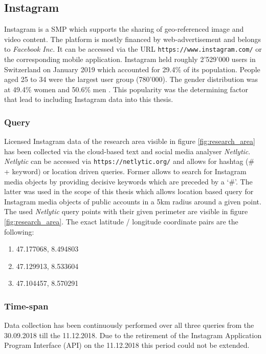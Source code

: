 \subsection{Instagram} \label{instagram}
Instagram is a SMP which supports the sharing of geo-referenced image and video content. The platform is mostly financed by web-advertisement and belongs to \textit{Facebook Inc.} It can be accessed via the URL \texttt{https://www.instagram.com/} or the corresponding mobile application.
Instagram held roughly 2\rq529\rq000 users in Switzerland on January 2019 which accounted for 29.4\% of its population. People aged 25 to 34 were the largest user group (780\rq 000). The gender distribution was at 49.4\% women and 50.6\% men \cite{NapoleonCat2019NoTitle}. This popularity was the determining factor that lead to including Instagram data into this thesis.\\

\subsubsection{Query} \label{netlytic}
Licensed Instagram data of the research area visible in figure \ref{fig:research_area} has been collected via the cloud-based text and social media analyser \textit{Netlytic}. \textit{Netlytic} can be accessed via \texttt{https://netlytic.org/} and allows for hashtag (\# + keyword) or location driven queries. Former allows to search for Instagram media objects by providing decisive keywords which are preceded by a \lq \#\rq. The latter was used in the scope of this thesis which allows location based query for Instagram media objects of public accounts in a 5km radius around a given point. The used \textit{Netlytic} query points with their given perimeter are visible in figure \ref{fig:research_area}. The exact latitude / longitude coordinate pairs are the following:\\
\begin{enumerate}
  \item 47.177068, 8.494803
  \item 47.129913, 8.533604
  \item 47.104457, 8.570291
\end{enumerate}

\subsubsection{Time-span} \label{instagram_timespan}
Data collection has been continuously performed over all three queries from the 30.09.2018 till the 11.12.2018. Due to the retirement of the Instagram Application Program Interface (API) on the 11.12.2018 \cite{Instagram2018InstagramRetirement} this period could not be extended.

